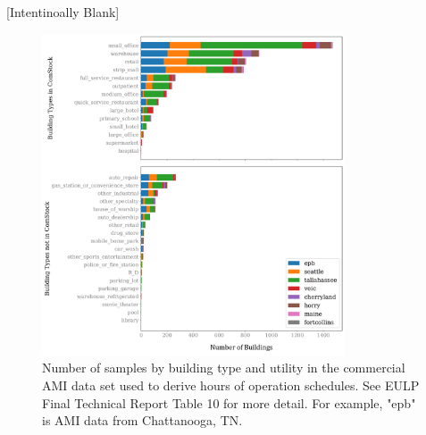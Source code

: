\label{appendix:B_figures}
[Intentinoally Blank]
\begin{figure}
    \centering \includegraphics[width=0.8\textwidth]{figures/utility_building_type.png}
    \caption[Number of samples by building type and utility in the commercial AMI data set]{Number of samples by building type and utility in the commercial AMI data set used to derive hours of operation schedules. See EULP Final Technical Report Table 10 for more detail. For example, "epb" is AMI data from Chattanooga, TN.}
    \label{fig:utility_building_type}
\end{figure}

